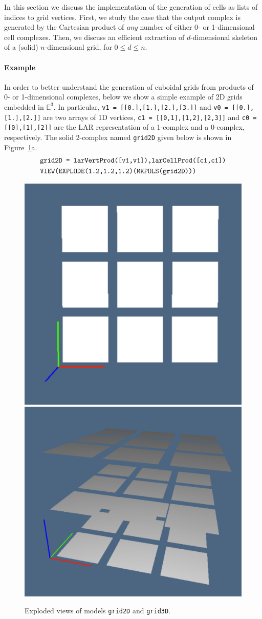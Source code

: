 \documentclass[11pt,oneside]{article}	%
\def\E{\mathbb{E}}
\begin{document}
In this section we discuss the implementation of the generation of cells as lists of indices to grid vertices. First, we study the case that the output complex is generated by the Cartesian product of \emph{any} number of either 0- or 1-dimensional cell complexes. Then, we discuss an efficient extraction of $d$-dimensional skeleton of a (solid) $n$-dimensional grid, for $0\leq d\leq n$.


\paragraph{Example}
In order to better understand the generation of cuboidal grids from products of 0- or 1-dimensional complexes, below we show a simple example of 2D grids embedded in $\E^3$.
In particular, \texttt{v1 = [[0.],[1.],[2.],[3.]]} and \texttt{v0 = [[0.],[1.],[2.]]} are two arrays of 1D vertices, \texttt{c1 = [[0,1],[1,2],[2,3]]} and \texttt{c0 = [[0],[1],[2]]} are the LAR representation of a 1-complex and a 0-complex, respectively. The solid 2-complex named \texttt{grid2D} given below is shown in Figure~\ref{fig:grid23D}a.
\begin{align*}\scriptsize
&\texttt{grid2D = larVertProd([v1,v1]),larCellProd([c1,c1])}\\
&\texttt{VIEW(EXPLODE(1.2,1.2,1.2)(MKPOLS(grid2D)))}
\end{align*}

\begin{figure}[htbp] %
   \centering
   \includegraphics[width=0.458\linewidth]{images/grid2D} 
   \includegraphics[width=0.532\linewidth]{images/grid3D} 
   \caption{Exploded views of models \texttt{grid2D} and \texttt{grid3D}.}
   \label{fig:grid23D}
\end{figure}
\end{document}
